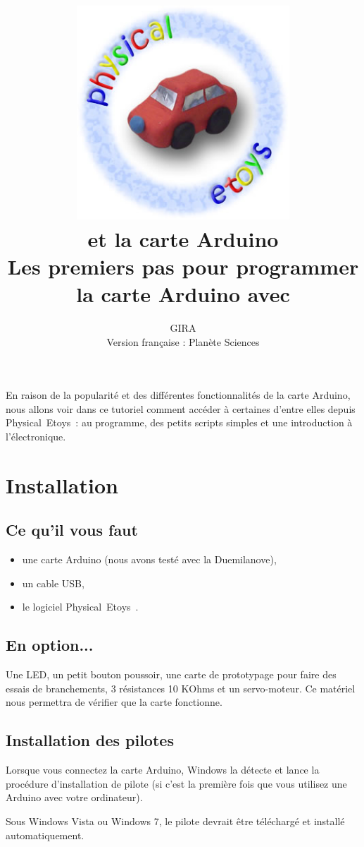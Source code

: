 \documentclass[french]{etoys-guide}
\title{
	\includegraphics[width=8cm]{../shared/images/physical_etoys_logo.jpg}\\
	\vfill
	\vspace{3em}
	\LARGE{\textbf{\appName et la carte Arduino}}\\[1cm]
	\large{Les premiers pas pour programmer la carte Arduino avec \appName}\\[1cm]
	\vfill
}
\author{
GIRA \\
Version française : Planète Sciences
}
\def\appName{Physical~Etoys~}
\begin{document}
\insertcover
\maketitle
\cleardoublepage
\tableofcontents
\cleardoublepage

En raison de la popularité et des différentes fonctionnalités de la carte
Arduino, nous allons voir dans ce tutoriel comment accéder à certaines d'entre
elles depuis \appName : au programme, des petits scripts simples et une
introduction à l'électronique.

\section{Installation}

\subsection{Ce qu'il vous faut}

\begin{itemize}
        \item une carte Arduino (nous avons testé avec la Duemilanove),
        \item un cable USB,
        \item le logiciel \appName.
\end{itemize}


\subsection{En option...}

Une LED, un petit bouton poussoir, une carte de prototypage pour faire des
essais de branchements, 3 résistances 10 KOhms et un servo-moteur. Ce matériel
nous permettra de vérifier que la carte fonctionne. 

\subsection{Installation des pilotes}

Lorsque vous connectez la carte Arduino, Windows la détecte et lance la
procédure d'installation de pilote (si c'est la première fois que vous utilisez
une Arduino avec votre ordinateur).

Sous Windows Vista ou Windows 7, le pilote devrait être téléchargé et installé
automatiquement.
\end{document}
